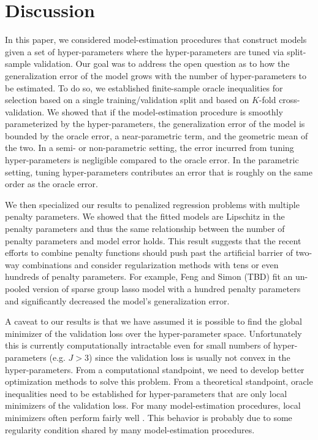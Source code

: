 \documentclass[12pt]{article}
\begin{document}
\section{Discussion}\label{sec:discussion}

In this paper, we considered model-estimation procedures that construct models given a set of hyper-parameters where the hyper-parameters are tuned via split-sample validation. Our goal was to address the open question as to how the generalization error of the model grows with the number of hyper-parameters to be estimated. To do so, we established finite-sample oracle inequalities for selection based on a single training/validation split and based on $K$-fold cross-validation. We showed that if the model-estimation procedure is smoothly parameterized by the hyper-parameters, the generalization error of the model is bounded by the oracle error, a near-parametric term, and the geometric mean of the two. In a semi- or non-parametric setting, the error incurred from tuning hyper-parameters is negligible compared to the oracle error. In the parametric setting, tuning hyper-parameters contributes an error that is roughly on the same order as the oracle error. 

We then specialized our results to penalized regression problems with multiple penalty parameters. We showed that the fitted models are Lipschitz in the penalty parameters and thus the same relationship between the number of penalty parameters and model error holds. This result suggests that the recent efforts to combine penalty functions should push past the artificial barrier of two-way combinations and consider regularization methods with tens or even hundreds of penalty parameters. For example, Feng and Simon (TBD) fit an un-pooled version of sparse group lasso model with a hundred penalty parameters and significantly decreased the model's generalization error.

A caveat to our results is that we have assumed it is possible to find the global minimizer of the validation loss over the hyper-parameter space. Unfortunately this is currently computationally intractable even for small numbers of hyper-parameters (e.g. $J > 3$) since the validation loss is usually not convex in the hyper-parameters. From a computational standpoint, we need to develop better optimization methods to solve this problem. From a theoretical standpoint, oracle inequalities need to be established for hyper-parameters that are only local minimizers of the validation loss. For many model-estimation procedures, local minimizers often perform fairly well \citep{kunapuli2008bilevel}. This behavior is probably due to some regularity condition shared by many model-estimation procedures.
\end{document}
